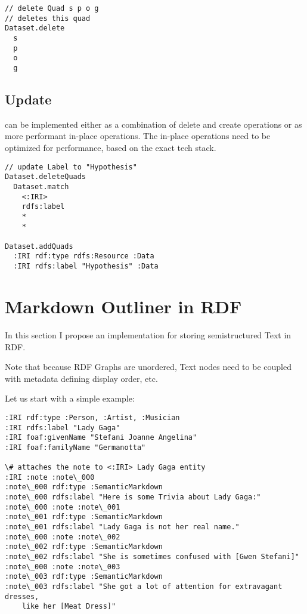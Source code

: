 \begin{lstlisting}
// delete Quad s p o g
// deletes this quad
Dataset.delete
  s
  p
  o
  g

\end{lstlisting}

\subsection*{Update} 
can be implemented either as a combination of delete and create operations or as more performant in-place operations. The in-place operations need to be optimized for performance, based on the exact tech stack.

\begin{lstlisting}
// update Label to "Hypothesis"
Dataset.deleteQuads
  Dataset.match
    <:IRI> 
    rdfs:label 
    * 
    *

Dataset.addQuads
  :IRI rdf:type rdfs:Resource :Data
  :IRI rdfs:label "Hypothesis" :Data

\end{lstlisting}


\section{Markdown Outliner in RDF}

In this section I propose an implementation for storing semistructured Text in RDF.

Note that because RDF Graphs are unordered, Text nodes need to be coupled with metadata defining display order, etc.

Let us start with a simple example:

\begin{lstlisting}
:IRI rdf:type :Person, :Artist, :Musician
:IRI rdfs:label "Lady Gaga"
:IRI foaf:givenName "Stefani Joanne Angelina"
:IRI foaf:familyName "Germanotta"

\# attaches the note to <:IRI> Lady Gaga entity
:IRI :note :note\_000                
:note\_000 rdf:type :SemanticMarkdown
:note\_000 rdfs:label "Here is some Trivia about Lady Gaga:"
:note\_000 :note :note\_001
:note\_001 rdf:type :SemanticMarkdown
:note\_001 rdfs:label "Lady Gaga is not her real name."
:note\_000 :note :note\_002
:note\_002 rdf:type :SemanticMarkdown
:note\_002 rdfs:label "She is sometimes confused with [Gwen Stefani]"
:note\_000 :note :note\_003
:note\_003 rdf:type :SemanticMarkdown
:note\_003 rdfs:label "She got a lot of attention for extravagant dresses, 
    like her [Meat Dress]"
\end{lstlisting}


